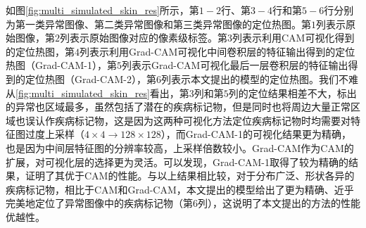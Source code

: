 如图\ref{fig:multi_simulated_skin_res}所示，第$1-2$行、第$3-4$行和第$5-6$行分别为第一类异常图像、第二类异常图像和第三类异常图像的定位热图。第$1$列表示原始图像，第$2$列表示原始图像对应的像素级标签。第$3$列表示利用CAM可视化得到的定位热图，第$4$列表示利用Grad-CAM可视化中间卷积层的特征输出得到的定位热图（Grad-CAM-1），第$5$列表示Grad-CAM可视化最后一层卷积层的特征输出得到的定位热图（Grad-CAM-2），第$6$列表示本文提出的模型的定位热图。我们不难从\ref{fig:multi_simulated_skin_res}看出，第$3$列和第$5$列的定位结果相差不大，标出的异常也区域最多，虽然包括了潜在的疾病标记物，但是同时也将周边大量正常区域也误认作疾病标记物，这是因为这两种可视化方法定位疾病标记物时均需要对特征图过度上采样（$4\times 4\rightarrow 128\times 128$），而Grad-CAM-1的可视化结果更为精确，也是因为中间层特征图的分辨率较高，上采样倍数较小。Grad-CAM作为CAM的扩展，对可视化层的选择更为灵活。可以发现，Grad-CAM-1取得了较为精确的结果，证明了其优于CAM的性能。与以上结果相比较，对于分布广泛、形状各异的疾病标记物，相比于CAM和Grad-CAM，本文提出的模型给出了更为精确、近乎完美地定位了异常图像中的疾病标记物（第$6$列），这说明了本文提出的方法的性能优越性。


